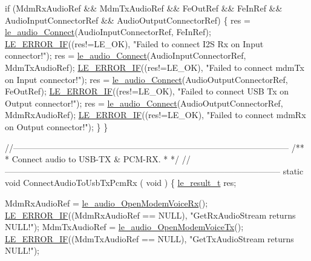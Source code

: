 \begin{DoxyCodeInclude}
{{{{{{{{{{{    \textcolor{keywordflow}{if} (MdmRxAudioRef && MdmTxAudioRef && FeOutRef && FeInRef &&
        AudioInputConnectorRef && AudioOutputConnectorRef)
    \{
        res = \hyperlink{le__audio__interface_8h_a338df65b2fb1ae0140d86880adbcf0de}{le\_audio\_Connect}(AudioInputConnectorRef, FeInRef);
        \hyperlink{le__log_8h_aceaf11a11691d6c676e36dd317b38dbd}{LE\_ERROR\_IF}((res!=LE\_OK), \textcolor{stringliteral}{"Failed to connect I2S Rx on Input connector!"});
        res = \hyperlink{le__audio__interface_8h_a338df65b2fb1ae0140d86880adbcf0de}{le\_audio\_Connect}(AudioInputConnectorRef, MdmTxAudioRef);
        \hyperlink{le__log_8h_aceaf11a11691d6c676e36dd317b38dbd}{LE\_ERROR\_IF}((res!=LE\_OK), \textcolor{stringliteral}{"Failed to connect mdmTx on Input connector!"});
        res = \hyperlink{le__audio__interface_8h_a338df65b2fb1ae0140d86880adbcf0de}{le\_audio\_Connect}(AudioOutputConnectorRef, FeOutRef);
        \hyperlink{le__log_8h_aceaf11a11691d6c676e36dd317b38dbd}{LE\_ERROR\_IF}((res!=LE\_OK), \textcolor{stringliteral}{"Failed to connect USB Tx on Output connector!"});
        res = \hyperlink{le__audio__interface_8h_a338df65b2fb1ae0140d86880adbcf0de}{le\_audio\_Connect}(AudioOutputConnectorRef, MdmRxAudioRef);
        \hyperlink{le__log_8h_aceaf11a11691d6c676e36dd317b38dbd}{LE\_ERROR\_IF}((res!=LE\_OK), \textcolor{stringliteral}{"Failed to connect mdmRx on Output connector!"});
    \}
\}

\textcolor{comment}{//--------------------------------------------------------------------------------------------------}\textcolor{comment}{}
\textcolor{comment}{/**}
\textcolor{comment}{ * Connect audio to USB-TX & PCM-RX.}
\textcolor{comment}{ *}
\textcolor{comment}{ */}
\textcolor{comment}{//--------------------------------------------------------------------------------------------------}
\textcolor{keyword}{static} \textcolor{keywordtype}{void} ConnectAudioToUsbTxPcmRx
(
    \textcolor{keywordtype}{void}
)
\{
    \hyperlink{le__basics_8h_a1cca095ed6ebab24b57a636382a6c86c}{le\_result\_t} res;

    MdmRxAudioRef = \hyperlink{le__audio__interface_8h_ae3ed568ba4d2763ea77e17e77b20ff02}{le\_audio\_OpenModemVoiceRx}();
    \hyperlink{le__log_8h_aceaf11a11691d6c676e36dd317b38dbd}{LE\_ERROR\_IF}((MdmRxAudioRef == NULL), \textcolor{stringliteral}{"GetRxAudioStream returns NULL!"});
    MdmTxAudioRef = \hyperlink{le__audio__interface_8h_ad745f008bb04873c817da7af3daf783d}{le\_audio\_OpenModemVoiceTx}();
    \hyperlink{le__log_8h_aceaf11a11691d6c676e36dd317b38dbd}{LE\_ERROR\_IF}((MdmTxAudioRef == NULL), \textcolor{stringliteral}{"GetTxAudioStream returns NULL!"});

}}}}}}}}}}}
\end{DoxyCodeInclude}
